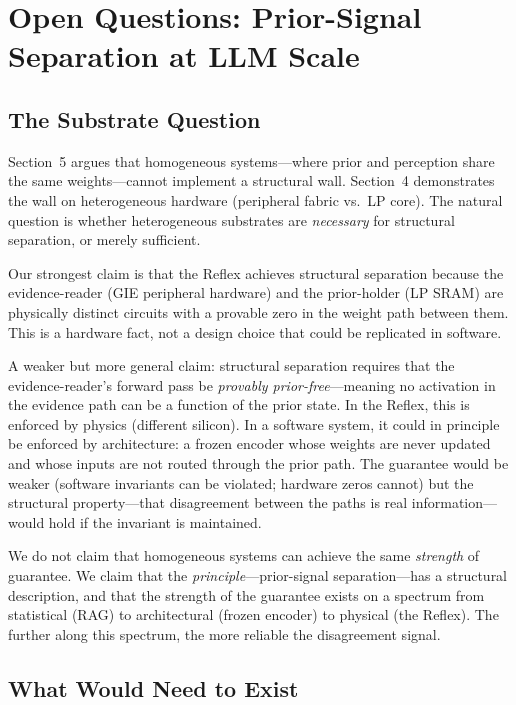 \documentclass[11pt,letterpaper]{article}
\begin{document}
\section{Open Questions: Prior-Signal Separation at LLM Scale}

\subsection{The Substrate Question}

Section~5 argues that homogeneous systems---where prior and perception share the same weights---cannot implement a structural wall. Section~4 demonstrates the wall on heterogeneous hardware (peripheral fabric vs.\ LP core). The natural question is whether heterogeneous substrates are \textit{necessary} for structural separation, or merely sufficient.

Our strongest claim is that the Reflex achieves structural separation because the evidence-reader (GIE peripheral hardware) and the prior-holder (LP SRAM) are physically distinct circuits with a provable zero in the weight path between them. This is a hardware fact, not a design choice that could be replicated in software.

A weaker but more general claim: structural separation requires that the evidence-reader's forward pass be \textit{provably prior-free}---meaning no activation in the evidence path can be a function of the prior state. In the Reflex, this is enforced by physics (different silicon). In a software system, it could in principle be enforced by architecture: a frozen encoder whose weights are never updated and whose inputs are not routed through the prior path. The guarantee would be weaker (software invariants can be violated; hardware zeros cannot) but the structural property---that disagreement between the paths is real information---would hold if the invariant is maintained.

We do not claim that homogeneous systems can achieve the same \textit{strength} of guarantee. We claim that the \textit{principle}---prior-signal separation---has a structural description, and that the strength of the guarantee exists on a spectrum from statistical (RAG) to architectural (frozen encoder) to physical (the Reflex). The further along this spectrum, the more reliable the disagreement signal.

\subsection{What Would Need to Exist}
\end{document}
